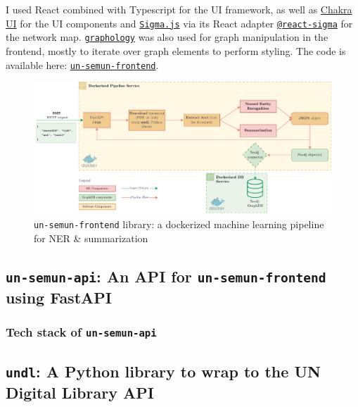 \documentclass[11pt]{article}
\begin{document}
I used React combined with Typescript for the UI framework, as well as \href{https://chakra-ui.com/}{Chakra UI} for the UI components and \href{https://www.sigmajs.org/}{\texttt{Sigma.js}} via its React adapter \href{https://sim51.github.io/react-sigma/}{\texttt{@react-sigma}} for the network map. \href{https://graphology.github.io/}{\texttt{graphology}} was also used for graph manipulation in the frontend, mostly to iterate over graph elements to perform styling. The code is available here: \href{https://github.com/ClementSicard/un-semun-frontend}{\faGithub{} \texttt{un-semun-frontend}}.



\begin{figure}[!htb]
    \centering

    \includegraphics[width=\textwidth]{res/ml-pipeline.pdf}
    \caption{\texttt{un-semun-frontend} library: a dockerized machine learning pipeline for NER \& summarization}

    \label{fig:frontend-screenshot}
\end{figure}



\subsection{\texttt{un-semun-api}: An API for \texttt{un-semun-frontend} using FastAPI} \label{ssec:un-semun-api-an-api-for-un-semun-frontend-using-fastapi}
\subsubsection*{Tech stack of \texttt{un-semun-api}} \label{sssec:tech-stack-of-un-semun-api}

\subsection{\texttt{undl}: A Python library to wrap to the UN Digital Library API} \label{ssec:undl-a-python-library-to-wrap-to-the-un-digital-library-api}
\end{document}
